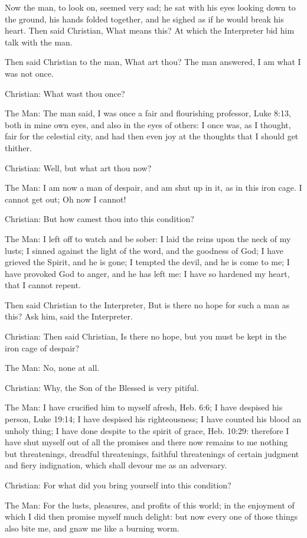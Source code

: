 Now the man, to look on, seemed very sad; he sat with his eyes looking down to the ground, his hands folded together, and he sighed as if he would break his heart. Then said Christian, What means this? At which the Interpreter bid him talk with the man.

Then said Christian to the man, What art thou? The man answered, I am what I was not once.

Christian: What wast thou once?

The Man: The man said, I was once a fair and flourishing professor, Luke 8:13, both in mine own eyes, and also in the eyes of others: I once was, as I thought, fair for the celestial city, and had then even joy at the thoughts that I should get thither.

Christian: Well, but what art thou now?

The Man: I am now a man of despair, and am shut up in it, as in this iron cage. I cannot get out; Oh now I cannot!

Christian: But how camest thou into this condition?

The Man: I left off to watch and be sober: I laid the reins upon the neck of my lusts; I sinned against the light of the word, and the goodness of God; I have grieved the Spirit, and he is gone; I tempted the devil, and he is come to me; I have provoked God to anger, and he has left me: I have so hardened my heart, that I cannot repent.

Then said Christian to the Interpreter, But is there no hope for such a man as this? Ask him, said the Interpreter.

Christian: Then said Christian, Is there no hope, but you must be kept in the iron cage of despair?

The Man: No, none at all.

Christian: Why, the Son of the Blessed is very pitiful.

The Man: I have crucified him to myself afresh, Heb. 6:6; I have despised his person, Luke 19:14; I have despised his righteousness; I have counted his blood an unholy thing; I have done despite to the spirit of grace, Heb. 10:29: therefore I have shut myself out of all the promises and there now remains to me nothing but threatenings, dreadful threatenings, faithful threatenings of certain judgment and fiery indignation, which shall devour me as an adversary.

Christian: For what did you bring yourself into this condition?

The Man: For the lusts, pleasures, and profits of this world; in the enjoyment of which I did then promise myself much delight: but now every one of those things also bite me, and gnaw me like a burning worm.

